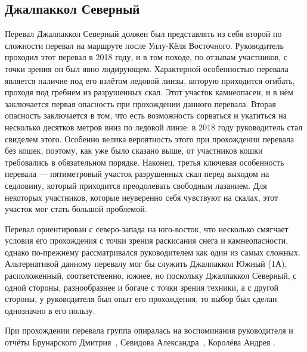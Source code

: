 \subsection{Джалпаккол Северный} 
Перевал Джалпаккол Северный должен был представлять из себя второй по сложности перевал на маршруте после Уллу-Кёля Восточного. Руководитель проходил этот перевал в 2018 году, и в том походе, по отзывам участников, с точки зрения он был явно лидирующем. Характерной особенностью перевала является наличие под его взлётом ледовой линзы, которую приходится огибать, проходя под гребнем из разрушенных скал. Этот участок камнеопасен, и в нём заключается первая опасность при прохождении данного перевала. Вторая опасность заключается в том, что есть возможность сорваться и укатиться на несколько десятков метров вниз по ледовой линзе: в 2018 году руководитель стал свиделем этого. Особенно велика вероятность этого при прохождении перевала без кошек, поэтому, как уже было сказано выше, от участников кошки требовались в обязательном порядке. Наконец, третья ключевая особенность перевала --- пятиметровый участок разрушенных скал перед выходом на седловину, который приходится преодолевать свободным лазанием. Для некоторых участников, которые неуверенно себя чувствуют на скалах, этот участок мог стать большой проблемой. 

Перевал ориентирован с северо-запада на юго-восток, что несколько смягчает условия его прохождения с точки зрения раскисания снега и камнеопасности, однако по-прежнему рассматривался руководителем как один из самых сложных. Альтернативой данному перевалу мог бы служить Джалпаккол Южный (1А), расположенный, соответственно, южнее, но поскольку Джалпаккол Северный, с одной стороны, разнообразнее и богаче с точки зрения техники, а с другой стороны, у руководителя был опыт его прохождения, то выбор был сделан однозначно в его пользу. 

При прохождении перевала группа опиралась на воспоминания руководителя и отчёты Брунарского Дмитрия~\cite{Brunarsky2023}, Севидова Александра~\cite{Sevidov2021}, Королёва Андрея \cite{Korolyov2018}.